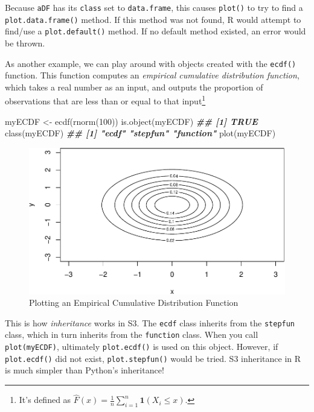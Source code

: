 \documentclass[
  12pt,
  krantz2]{krantz}
\makeatletter
\newenvironment{Shaded}{\begin{snugshade}}{\end{snugshade}}
\newcommand{\DecValTok}[1]{\textcolor[rgb]{0.06,0.06,0.06}{#1}}
\newcommand{\DocumentationTok}[1]{\textcolor[rgb]{0.37,0.37,0.37}{\textbf{\textit{#1}}}}
\newcommand{\FunctionTok}[1]{\textcolor[rgb]{0,0,0}{#1}}
\newcommand{\NormalTok}[1]{#1}
\newcommand{\OtherTok}[1]{\textcolor[rgb]{0.37,0.37,0.37}{#1}}
\newenvironment{kframe}{%
\medskip{}
\setlength{\fboxsep}{.8em}
 \def\at@end@of@kframe{}%
 \ifinner\ifhmode%
  \def\at@end@of@kframe{\end{minipage}}%
  \begin{minipage}{\columnwidth}%
 \fi\fi%
 \def\FrameCommand##1{\hskip\@totalleftmargin \hskip-\fboxsep
 \colorbox{shadecolor}{##1}\hskip-\fboxsep
     \hskip-\linewidth \hskip-\@totalleftmargin \hskip\columnwidth}%
 \MakeFramed {\advance\hsize-\width
   \@totalleftmargin\z@ \linewidth\hsize
   \@setminipage}}%
 {\par\unskip\endMakeFramed%
 \at@end@of@kframe}
\renewenvironment{Shaded}{\begin{kframe}}{\end{kframe}}
\makeatother
\begin{document}
Because \texttt{aDF} has its \texttt{class} set to \texttt{data.frame}, this causes \texttt{plot()} to try to find a \texttt{plot.data.frame()} method. If this method was not found, R would attempt to find/use a \texttt{plot.default()} method. If no default method existed, an error would be thrown.

As another example, we can play around with objects created with the \texttt{ecdf()} function. This function computes an \emph{empirical cumulative distribution function}, which takes a real number as an input, and outputs the proportion of observations that are less than or equal to that input\footnote{It's defined as \(\hat{F}(x) = \frac{1}{n}\sum_{i=1}^n \mathbf{1}(X_i \le x)\).}

\begin{Shaded}
\begin{Highlighting}[]
\NormalTok{myECDF }\OtherTok{\textless{}{-}} \FunctionTok{ecdf}\NormalTok{(}\FunctionTok{rnorm}\NormalTok{(}\DecValTok{100}\NormalTok{))}
\FunctionTok{is.object}\NormalTok{(myECDF)}
\DocumentationTok{\#\# [1] TRUE}
\FunctionTok{class}\NormalTok{(myECDF)}
\DocumentationTok{\#\# [1] "ecdf"     "stepfun"  "function"}
\FunctionTok{plot}\NormalTok{(myECDF)}
\end{Highlighting}
\end{Shaded}

\begin{figure}

{\centering \includegraphics[width=0.5\linewidth]{r_and_python_book_files/figure-latex/unnamed-chunk-248-1} 

}

\caption{Plotting an Empirical Cumulative Distribution Function}\label{fig:unnamed-chunk-248}
\end{figure}

This is how \emph{inheritance} works in S3. The \texttt{ecdf} class inherits from the \texttt{stepfun} class, which in turn inherits from the \texttt{function} class. When you call \texttt{plot(myECDF)}, ultimately \texttt{plot.ecdf()} is used on this object. However, if \texttt{plot.ecdf()} did not exist, \texttt{plot.stepfun()} would be tried. S3 inheritance in R is much simpler than Python's inheritance!
\end{document}
